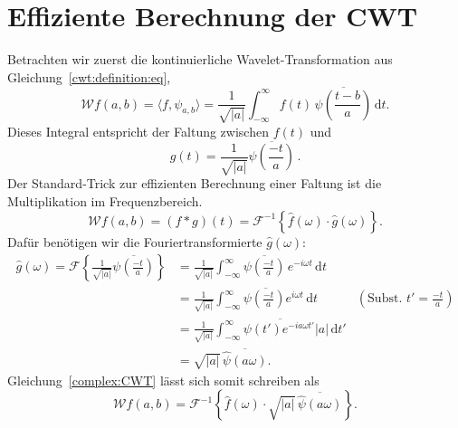 \section{Effiziente Berechnung der CWT}

Betrachten wir zuerst die kontinuierliche Wavelet-Transformation aus Gleichung~\eqref{cwt:definition:eq},
\begin{equation}
\mathcal{W}f (a,b)
=
\langle f,\psi_{a,b}\rangle
=
\frac{1}{\sqrt{|a|}}\int_{-\infty}^\infty f(t)\,
	\overline{\psi\left(\frac{t-b}{a}\right)}\,\mathrm{d}t.\label{complex:CWT}
\end{equation}
Dieses Integral entspricht der Faltung zwischen $f(t)$ und 
\begin{equation} 
    g(t) 
    = \frac{1}{\sqrt{|a|}} \overline{\psi\left(\frac{-t}{a}\right)} \,.
\end{equation}
Der Standard-Trick zur effizienten Berechnung einer Faltung ist die Multiplikation im Frequenzbereich.
\begin{equation} 
\mathcal{W}f (a,b) = (f*g)(t) = \mathcal{F}^{-1}\left\lbrace\hat f(\omega) \cdot \hat g (\omega) \right\rbrace.
\end{equation}
Dafür benötigen wir die Fouriertransformierte $\hat g (\omega)$:
\begin{align*}
	\hat g (\omega) = 
    \mathcal{F}\left\lbrace \frac{1}{\sqrt{|a|}} \overline{\psi\left(\frac{-t}{a}\right)}\right\rbrace 
	&= \frac{1}{\sqrt{|a|}} \int_{-\infty}^{\infty}\overline{\psi\left(\frac{-t}{a}\right)}\,e^{-i\omega t}\,\mathrm{d}t\\
	&= \frac{1}{\sqrt{|a|}} \overline{\int_{-\infty}^{\infty}\psi\left(\frac{-t}{a}\right)e^{i\omega t}\,\mathrm{d}t}  
    & \left(\text{Subst. } t' = \frac{-t}{a}\right)\\
	&= \frac{1}{\sqrt{|a|}} \overline{\int_{-\infty}^{\infty}\psi\left(t'\right)e^{-ia\omega t'} |a|\,\mathrm{d}t'}\\
	&= \sqrt{|a|} \, \overline{\hat{\psi}\left(a\omega\right)}.
\end{align*}
Gleichung~\eqref{complex:CWT} lässt sich somit schreiben als
\begin{equation}
\mathcal{W}f(a,b)
= \mathcal{F}^{-1}\left\lbrace\hat{f}(\omega)\cdot\! \sqrt{|a|}\, \overline{\hat{\psi}\left(a\omega\right)}\right\rbrace. \label{complex:fcwt}
\end{equation}

